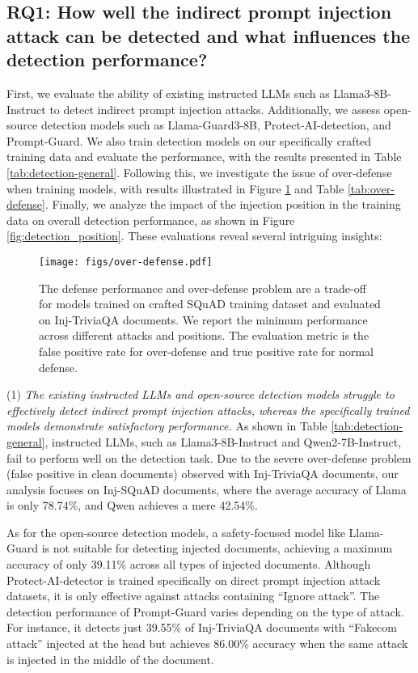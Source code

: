 \subsection{RQ1: How well the indirect prompt injection attack can be detected and what influences the detection performance?}
\label{sec:rq1}
First, we evaluate the ability of existing instructed LLMs such as Llama3-8B-Instruct to detect indirect prompt injection attacks. Additionally, we assess open-source detection models such as Llama-Guard3-8B, Protect-AI-detection, and Prompt-Guard.
We also train detection models on our specifically crafted training data and evaluate the performance, with the results presented in Table \ref{tab:detection-general}. Following this, we investigate the issue of over-defense when training models, with results illustrated in Figure \ref{fig:over-defense} and Table \ref{tab:over-defense}. Finally, we analyze the impact of the injection position in the training data on overall detection performance, as shown in Figure \ref{fig:detection_position}. These evaluations reveal several intriguing insights:
\begin{figure}[!h]
    \centering
    \texttt{[image: figs/over-defense.pdf]}
    \caption{The defense performance and over-defense problem are a trade-off for models trained on crafted SQuAD training dataset and evaluated on Inj-TriviaQA documents. We report the minimum performance across different attacks and positions. The evaluation metric is the false positive rate for over-defense and true positive rate for normal defense.}
    \label{fig:over-defense}
    \vspace{-10pt}
\end{figure}

\vspace{5pt}
(1) \textit{The existing instructed LLMs and open-source detection models struggle to effectively detect indirect prompt injection attacks, whereas the specifically trained models demonstrate satisfactory performance.}
As shown in Table \ref{tab:detection-general}, instructed LLMs, such as Llama3-8B-Instruct and Qwen2-7B-Instruct, fail to perform well on the detection task. Due to the severe over-defense problem (false positive in clean documents) observed with Inj-TriviaQA documents, our analysis focuses on Inj-SQuAD documents, where the average accuracy of Llama is only 78.74\%, and Qwen achieves a mere 42.54\%.

As for the open-source detection models, a safety-focused model like Llama-Guard is not suitable for detecting injected documents, achieving a maximum accuracy of only 39.11\% across all types of injected documents. 
Although Protect-AI-detector is trained specifically on direct prompt injection attack datasets, it is only effective against attacks containing ``Ignore attack''. The detection performance of Prompt-Guard varies depending on the type of attack. For instance, it detects just 39.55\% of Inj-TriviaQA documents with ``Fakecom attack'' injected at the head but achieves 86.00\% accuracy when the same attack is injected in the middle of the document.

